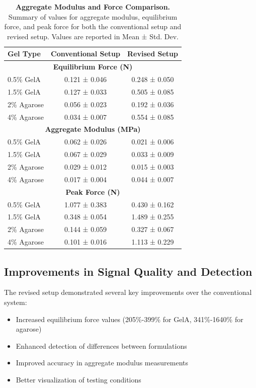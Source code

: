 \begin{table}[htbp]
\centering
\caption{\textbf{Aggregate Modulus and Force Comparison.} Summary of values for aggregate modulus, equilibrium force, and peak force for both the conventional setup and revised setup. Values are reported in Mean ± Std. Dev.}
\label{tab:aggregate_force_comparison}
\begin{tabular}{|l|c|c|}
\hline
\textbf{Gel Type} & \textbf{Conventional Setup} & \textbf{Revised Setup} \\
\hline
\multicolumn{3}{|c|}{\textbf{Equilibrium Force (N)}} \\
\hline
0.5\% GelA       & 0.121 ± 0.046  & 0.248 ± 0.050 \\
1.5\% GelA       & 0.127 ± 0.033  & 0.505 ± 0.085 \\
2\% Agarose      & 0.056 ± 0.023  & 0.192 ± 0.036 \\
4\% Agarose      & 0.034 ± 0.007  & 0.554 ± 0.085 \\
\hline
\multicolumn{3}{|c|}{\textbf{Aggregate Modulus (MPa)}} \\
\hline
0.5\% GelA       & 0.062 ± 0.026  & 0.021 ± 0.006 \\
1.5\% GelA       & 0.067 ± 0.029  & 0.033 ± 0.009 \\
2\% Agarose      & 0.029 ± 0.012  & 0.015 ± 0.003 \\
4\% Agarose      & 0.017 ± 0.004  & 0.044 ± 0.007 \\
\hline
\multicolumn{3}{|c|}{\textbf{Peak Force (N)}} \\
\hline
0.5\% GelA       & 1.077 ± 0.383  & 0.430 ± 0.162 \\
1.5\% GelA       & 0.348 ± 0.054  & 1.489 ± 0.255 \\
2\% Agarose      & 0.144 ± 0.059  & 0.327 ± 0.067 \\
4\% Agarose      & 0.101 ± 0.016  & 1.113 ± 0.229 \\
\hline
\end{tabular}
\end{table}

\subsection{Improvements in Signal Quality and Detection}

The revised setup demonstrated several key improvements over the conventional system:
\begin{itemize}
    \item Increased equilibrium force values (205\%-399\% for GelA, 341\%-1640\% for agarose)
    \item Enhanced detection of differences between formulations
    \item Improved accuracy in aggregate modulus measurements
    \item Better visualization of testing conditions
\end{itemize}

